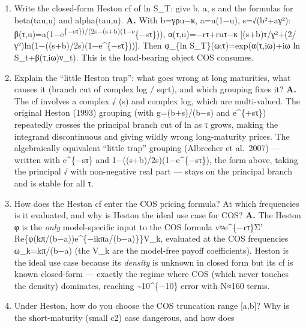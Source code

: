 \documentclass[
  11pt,
]{article}
\begin{document}
\begin{enumerate}
  beta\^{}2 explicitly via g = 1/beta. Then integrate for alpha.
  \textbf{A.} Set g=1/β; then ġ=−/β²=κg−½γ², a linear ODE. With
  integrating factor e\^{}\{−κt\}: d(g
  e\textsuperscript{\{−κt\})=−½γ²e}\{−κt\}dt, so
  g(t)=e\textsuperscript{\{κt\}(g(0)−γ²(1−e}\{−κt\})/(2κ)), g(0)=1/u.
  Inverting, β(t)=u e\^{}\{−κt\}/(1−½uγ²ξ\_κ(t)) with
  ξ\_κ(t)=(1−e\^{}\{−κt\})/κ. Then =κβ integrates (since
  e\^{}\{−κs\}=ξ\_κ') to α(t)=−(2κ/γ²)ln(1−½uγ²ξ\_κ(t)). This is the
  same Riccati mechanism behind the full Heston cf.
\item
  Write the closed-form Heston cf of ln S\_T: give b, a, s and the
  formulas for beta(tau,u) and alpha(tau,u). \textbf{A.} With b=γρu−κ,
  a=u(1−u), s=√(b²+aγ²):
  β(τ,u)=a(1−e\textsuperscript{\{−sτ\})/(2s−(s+b)(1−e}\{−sτ\})),
  α(τ,u)=−rτ+ruτ−κ{[}(s+b)τ/γ²+(2/γ²)ln(1−((s+b)/2s)(1−e\^{}\{−sτ\})){]}.
  Then φ\_\{ln S\_T\}(ω;τ)=exp(α(τ,iω)+iω ln S\_t+β(τ,iω)ν\_t). This is
  the load-bearing object COS consumes.
\item
  Explain the ``little Heston trap'': what goes wrong at long
  maturities, what causes it (branch cut of complex log / sqrt), and
  which grouping fixes it? \textbf{A.} The cf involves a complex √ (s)
  and complex log, which are multi-valued. The original Heston (1993)
  grouping (with g=(b+s)/(b−s) and e\^{}\{+sτ\}) repeatedly crosses the
  principal branch cut of ln as τ grows, making the integrand
  discontinuous and giving wildly wrong long-maturity prices. The
  algebraically equivalent ``little trap'' grouping (Albrecher et
  al.~2007) --- written with e\^{}\{−sτ\} and
  1−((s+b)/2s)(1−e\^{}\{−sτ\}), the form above, taking the principal √
  with non-negative real part --- stays on the principal branch and is
  stable for all τ.
\item
  How does the Heston cf enter the COS pricing formula? At which
  frequencies is it evaluated, and why is Heston the ideal use case for
  COS? \textbf{A.} The Heston φ is the \emph{only} model-specific input
  to the COS formula v≈e\^{}\{−rτ\}Σ'
  Re\{φ(kπ/(b−a))e\^{}\{−ikπa/(b−a)\}\}V\_k, evaluated at the COS
  frequencies ω\_k=kπ/(b−a) (the V\_k are the model-free payoff
  coefficients). Heston is the ideal use case because its \emph{density}
  is unknown in closed form but its cf is known closed-form --- exactly
  the regime where COS (which never touches the density) dominates,
  reaching \textasciitilde10\^{}\{−10\} error with N≈160 terms.
\item
  Under Heston, how do you choose the COS truncation range {[}a,b{]}?
  Why is the short-maturity (small c2) case dangerous, and how does

\end{enumerate}
\end{document}
